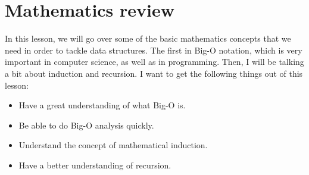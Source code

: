 \documentclass[../notebook.tex]{subfiles}
\begin{document}
\begin{center}

\end{center}

\section{ Mathematics review }
In this lesson, we will go over some of the basic mathematics concepts that we need in order to tackle data structures. The first in Big-O notation, which is very important in computer science, as well as in programming. Then, I will be talking a bit about induction and recursion. I want to get the following things out of this lesson:
\begin{itemize}
  \item Have a great understanding of what Big-O is.
  \item Be able to do Big-O analysis quickly.
  \item Understand the concept of mathematical induction.
  \item Have a better understanding of recursion.
\end{itemize}
\end{document}
